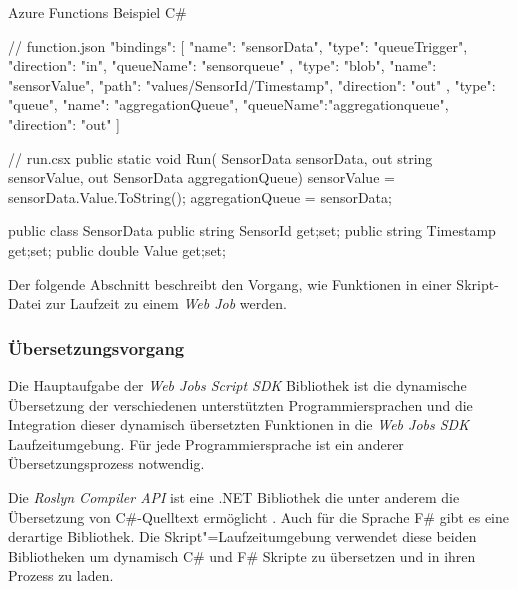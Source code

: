 \begin{program}[!hbt]
\caption{Azure Functions Beispiel C\#}
\noindent\begin{minipage}[t]{.49\textwidth}
\lstset{xleftmargin=0.0cm,framexleftmargin=0.0cm}
\begin{CsCode}[numbers=none]
// function.json
{
  "bindings": [
    { "name": "sensorData",
      "type": "queueTrigger",
      "direction": "in",
      "queueName": "sensorqueue" 
		},
    { "type": "blob",
      "name": "sensorValue",
      "path": "values/{SensorId}/{Timestamp}",
      "direction": "out"
    },
    { "type": "queue",
      "name": "aggregationQueue",
      "queueName":"aggregationqueue",
      "direction": "out"
    }
  ]
}
\end{CsCode}
\end{minipage}\hfill
\begin{minipage}[t]{.48\textwidth}
\lstset{showlines=true,xleftmargin=0.0cm,framexleftmargin=0.0cm}
\begin{CsCode}[numbers=none]
// run.csx
public static void Run(
  SensorData sensorData, 
  out string sensorValue, 
  out SensorData aggregationQueue) {
    sensorValue = 
      sensorData.Value.ToString();
    aggregationQueue = sensorData;
}

public class SensorData {
  public string SensorId {get;set;}
  public string Timestamp {get;set;}
  public double Value {get;set;}
}






\end{CsCode} %
\end{minipage}
\end{program}

Der folgende Abschnitt beschreibt den Vorgang, wie Funktionen in einer Skript-Datei zur Laufzeit zu einem \textit{Web Job} werden.

\subsubsection{Übersetzungsvorgang}

Die Hauptaufgabe der \textit{Web Jobs Script SDK} Bibliothek ist die dynamische Übersetzung der verschiedenen unterstützten Programmiersprachen und die Integration dieser dynamisch übersetzten Funktionen in die \textit{Web Jobs SDK} Laufzeitumgebung. Für jede Programmiersprache ist ein anderer Übersetzungsprozess notwendig.

Die \textit{Roslyn Compiler API} ist eine .NET Bibliothek die unter anderem die Übersetzung von C\#-Quelltext ermöglicht \cite[5]{Roslyn}. Auch für die Sprache F\# gibt es eine derartige Bibliothek. Die Skript"=Laufzeitumgebung verwendet diese beiden Bibliotheken um dynamisch C\# und F\# Skripte zu übersetzen und in ihren Prozess zu laden.


